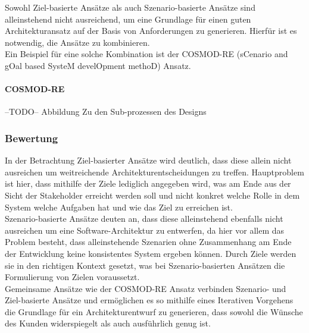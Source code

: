 Sowohl Ziel-basierte Ansätze als auch Szenario-basierte Ansätze sind alleinstehend nicht ausreichend, um eine Grundlage für einen guten Architekturansatz auf der Basis von Anforderungen zu generieren. Hierfür ist es notwendig, die Ansätze zu kombinieren. \\

Ein Beispiel für eine solche Kombination ist der COSMOD-RE (sCenario and gOal based SysteM develOpment methoD) Ansatz. \\

\paragraph{COSMOD-RE}



--TODO-- Abbildung Zu den Sub-prozessen des Designs\\

\subsubsection{Bewertung}
In der Betrachtung Ziel-basierter Ansätze wird deutlich, dass diese allein nicht ausreichen um weitreichende Architekturentscheidungen zu treffen. Hauptproblem ist hier, dass mithilfe der Ziele lediglich angegeben wird, was am Ende aus der Sicht der Stakeholder erreicht werden soll und nicht konkret welche Rolle in dem System welche Aufgaben hat und wie das Ziel zu erreichen ist.\\

Szenario-basierte Ansätze deuten an, dass diese alleinstehend ebenfalls nicht ausreichen um eine Software-Architektur zu entwerfen, da hier vor allem das Problem besteht, dass alleinstehende Szenarien ohne Zusammenhang am Ende der Entwicklung keine konsistentes System ergeben können. Durch Ziele werden sie in den richtigen Kontext gesetzt, was bei Szenario-basierten Ansätzen die Formulierung von Zielen voraussetzt.\\

Gemeinsame Ansätze wie der COSMOD-RE Ansatz verbinden Szenario- und Ziel-basierte Ansätze und ermöglichen es so mithilfe eines Iterativen Vorgehens die Grundlage für ein Architekturentwurf zu generieren, dass sowohl die Wünsche des Kunden widerspiegelt als auch ausführlich genug ist.
